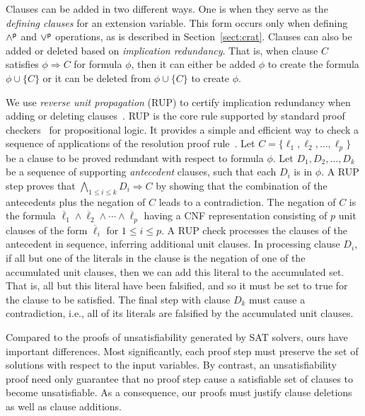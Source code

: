\documentclass[letterpaper,USenglish,cleveref, autoref, thm-restate]{lipics-v2021}
\newcommand{\pand}{\mathbin{\land^{\sf p}}}
\newcommand{\por}{\mathbin{\lor^{\sf p}}}
\newcommand{\obar}[1]{\overline{#1}}
\newcommand{\lit}{\ell}
\newcommand{\imply}{\Rightarrow}
\begin{document}
Clauses can be added in two different ways.  One is when they serve as
the {\em defining clauses} for an extension variable.  This form
occurs only when defining $\pand$ and $\por$ operations, as is
described in Section~\ref{sect:crat}.  Clauses can also be added or
deleted based on {\em implication redundancy}.  That is, when clause
$C$ satisfies $\phi \imply C$ for formula $\phi$, then it can either
be added $\phi$ to create the formula $\phi \cup \{C\}$ or it can be deleted
from $\phi \cup \{C\}$ to create $\phi$.

We use {\em reverse unit propagation} (RUP) to certify
implication redundancy when adding or deleting
clauses~\cite{goldberg,vangelder08_verifying_rup_proofs}.
RUP
is the core rule supported by standard
proof checkers~\cite{RAT,wetzler14_drattrim} for propositional logic. It provides a simple and efficient
way to check a sequence of applications of the resolution proof rule~\cite{robinson-1965}.
Let $C = \{\lit_1, \lit_2, \ldots,\lit_p\}$ be a clause to be
proved redundant with respect to formula $\phi$.  Let $D_1, D_2, \ldots, D_k$ be a sequence of supporting
{\em antecedent} clauses, such that each $D_i$ is in $\phi$.
A RUP step
proves that $\bigwedge_{1\leq i \leq k} D_i \imply C$ by showing
that the combination of the antecedents plus the negation of $C$ leads
to a contradiction.  The negation of $C$ is the formula
$\overline{\lit}_1 \land \overline{\lit}_2 \land \cdots \land
\overline{\lit}_p$ having a CNF representation consisting of $p$ unit
clauses of the form $\obar{\lit}_i$ for $1 \leq i \leq p$.  A RUP
check processes the clauses of the antecedent in sequence, inferring
additional unit clauses.  In processing clause $D_i$, if all but one
of the literals in the clause is the negation of one of the
accumulated unit clauses, then we can add this literal to the
accumulated set.  That is, all but this literal have been falsified,
and so it must be set to true for the clause to be satisfied.  The
final step with clause $D_k$ must cause a contradiction, i.e., all of
its literals are falsified by the accumulated unit clauses.

Compared to the proofs of unsatisfiability generated by SAT solvers,
ours have important differences.  Most
significantly, each proof step must preserve the set of solutions with respect to the input variables.
By contrast, an unsatisfiability proof need only guarantee that
no proof step cause a satisfiable set of clauses to become
unsatisfiable.  As a consequence, our proofs must justify clause deletions as well as clause additions.
\end{document}
